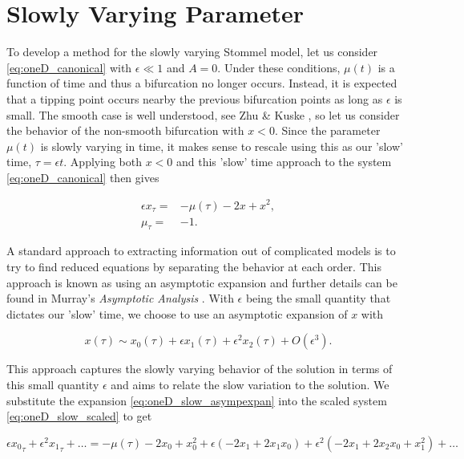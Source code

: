 \section{Slowly Varying Parameter}
\label{sec:oneD_slow}

To develop a method for the slowly varying Stommel model, let us consider \eqref{eq:oneD_canonical} with $\epsilon\ll 1$ and $A=0$. Under these conditions, $\mu(t)$ is a function of time and thus a bifurcation no longer occurs. Instead, it is expected that a tipping point occurs nearby the previous bifurcation points as long as $\epsilon$ is small. The smooth case is well understood, see Zhu \& Kuske \cite{zhu2015tipping}, so let us consider the behavior of the non-smooth bifurcation with $x<0$. Since the parameter $\mu(t)$ is slowly varying in time, it makes sense to rescale using this as our 'slow' time, $\tau=\epsilon t$. Applying both $x<0$ and this 'slow' time approach to the system \eqref{eq:oneD_canonical} then gives

\begin{equation}\label{eq:oneD_slow_scaled}
\begin{aligned}
\epsilon x_\tau=&-\mu(\tau)-2x+x^2,\\
\mu_\tau=&-1.
\end{aligned}
\end{equation}

A standard approach to extracting information out of complicated models is to try to find reduced equations by separating the behavior at each order. This approach is known as using an asymptotic expansion and further details can be found in Murray's \textit{Asymptotic Analysis} \cite{murray2012asymptotic}. With $\epsilon$ being the small quantity that dictates our 'slow' time, we choose to use an asymptotic expansion of $x$ with

\begin{equation}\label{eq:oneD_slow_asympexpan}
x(\tau)\sim x_0(\tau)+\epsilon x_1(\tau)+\epsilon^2 x_2(\tau)+O(\epsilon^3).
\end{equation}

This approach captures the slowly varying behavior of the solution in terms of this small quantity $\epsilon$ and aims to relate the slow variation to the solution. We substitute the expansion \eqref{eq:oneD_slow_asympexpan} into the scaled system \eqref{eq:oneD_slow_scaled} to get

\begin{equation*}
\epsilon {x_0}_\tau +\epsilon^2 {x_1}_\tau+\ldots= -\mu(\tau) -2x_0+x_0^2+\epsilon(-2x_1+2x_1x_0)+\epsilon^2(-2x_1+2x_2x_0+x_1^2)+\ldots
\end{equation*}

